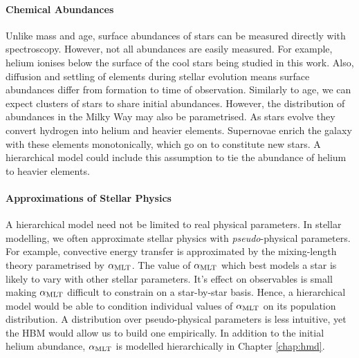 \paragraph{Chemical Abundances} Unlike mass and age, surface abundances of stars can be measured directly with spectroscopy. However, not all abundances are easily measured. For example, helium ionises below the surface of the cool stars being studied in this work. Also, diffusion and settling of elements during stellar evolution means surface abundances differ from formation to time of observation. Similarly to age, we can expect clusters of stars to share initial abundances. However, the distribution of abundances in the Milky Way may also be parametrised. As stars evolve they convert hydrogen into helium and heavier elements. Supernovae enrich the galaxy with these elements monotonically, which go on to constitute new stars. A hierarchical model could include this assumption to tie the abundance of helium to heavier elements.

\paragraph{Approximations of Stellar Physics} A hierarchical model need not be limited to real physical parameters. In stellar modelling, we often approximate stellar physics with \emph{pseudo}-physical parameters. For example, convective energy transfer is approximated by the mixing-length theory \citep[MLT;][]{Gough1977} parametrised by \({\alpha_\mathrm{MLT}}\). The value of \({\alpha_\mathrm{MLT}}\) which best models a star is likely to vary with other stellar parameters. It's effect on observables is small making \({\alpha_\mathrm{MLT}}\) difficult to constrain on a star-by-star basis. Hence, a hierarchical model would be able to condition individual values of \({\alpha_\mathrm{MLT}}\) on its population distribution. A distribution over pseudo-physical parameters is less intuitive, yet the HBM would allow us to build one empirically. In addition to the initial helium abundance, \({\alpha_\mathrm{MLT}}\) is modelled hierarchically in Chapter \ref{chap:hmd}.
